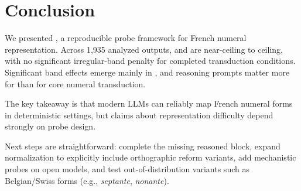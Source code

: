 \section{Conclusion}
\label{sec:conclusion}
We presented \frcountmap, a reproducible probe framework for French numeral representation. Across 1,935 analyzed outputs, \digitword and \worddigit are near-ceiling to ceiling, with no significant irregular-band penalty for completed transduction conditions. Significant band effects emerge mainly in \patterncls, and reasoning prompts matter more for \mgsmfr than for core numeral transduction.

The key takeaway is that modern LLMs can reliably map French numeral forms in deterministic settings, but claims about representation difficulty depend strongly on probe design.

Next steps are straightforward: complete the missing \gptfouronemini reasoned block, expand normalization to explicitly include orthographic reform variants, add mechanistic probes on open models, and test out-of-distribution variants such as Belgian/Swiss forms (e.g., \textit{septante}, \textit{nonante}).
